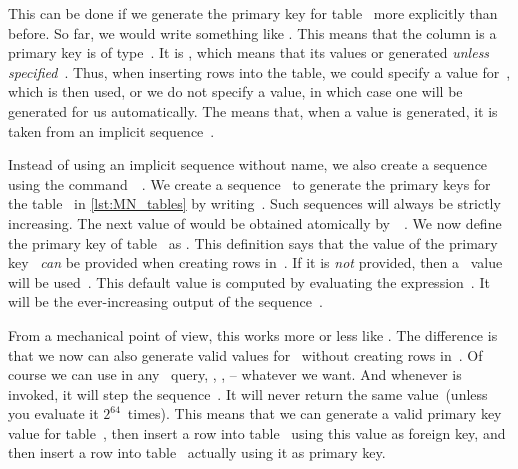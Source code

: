 This can be done if we generate the primary key for table~ more explicitly than before.
So far, we would write something like .
This means that the column is a primary key is of type~.
It is , which means that its values or generated \emph{unless specified}~\cite{PGDG:PD:GC}.
Thus, when inserting rows into the table, we could specify a value for~, which is then used, or we do not specify a value, in which case one will be generated for us automatically.
The  means that, when a value is generated, it is taken from an implicit sequence~\cite{PGDG:PD:IC}.

Instead of using an implicit sequence without name, we also create a sequence using the command~~\cite{PGDG:PD:CS}.
We create a sequence~ to generate the primary keys for the table~ in \cref{lst:MN_tables} by writing~.
Such sequences will always be strictly increasing.
The next value of  would be obtained atomically by~~\cite{PGDG:PD:SMF}.
We now define the primary key of table~ as .
This definition says that the value of the primary key~ \emph{can} be provided when creating rows in~.
If it is \emph{not} provided, then a~ value will be used~\cite{PGDG:PD:DV2}.
This default value is computed by evaluating the expression~.
It will be the ever-increasing output of the sequence~.%
%
\begin{sloppypar}%
From a mechanical point of view, this works more or less like \linebreak[3].
The difference is that we now can also generate valid values for~ without creating rows in~.
Of course we can use  in any \sql\ query, , ,  -- whatever we want.
And whenever  is invoked, it will step the sequence~.
It will never return the same value~(unless you evaluate it $2^{64}$~times).
This means that we can generate a valid primary key value for table~, then insert a row into table~ using this value as foreign key, and then insert a row into table~ actually using it as primary key.%
\end{sloppypar}%
